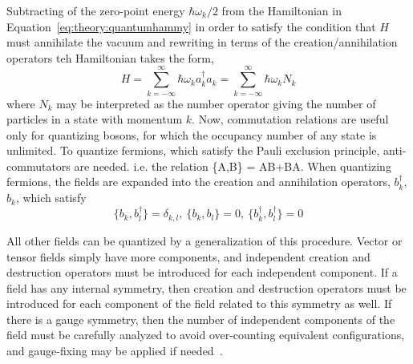 Subtracting of the zero-point energy $\hbar\omega_{k}/2$ from the Hamiltonian in Equation~\ref{eq:theory:quantumhammy} in order to satisfy the condition that $H$ must annihilate the vacuum and rewriting in terms of the creation/annihilation operators teh Hamiltonian takes the form,
\begin{equation}
     H = \sum_{k=-\infty}^{\infty} \hbar\omega_k a_k^\dagger a_k = \sum_{k=-\infty}^{\infty} \hbar\omega_k N_k
\end{equation}
where $N_k$ may be interpreted as the number operator giving the number of particles in a state with momentum $k$.
Now, commutation relations are useful only for quantizing bosons, for which the occupancy number of any state is unlimited. To quantize fermions, which satisfy the Pauli exclusion principle, anti-commutators are needed. i.e. the relation  \{A,B\} = AB+BA.
When quantizing fermions, the fields are expanded into the creation and annihilation operators, $b_{k}^{\dagger}$, $b_{k}$, which satisfy
\begin{equation}
    \{ b_{k}, b_{l}^{\dagger}\} = \delta_{k,l}, ~  \{ b_{k}, b_{l}\} = 0, ~ \{ b_{k}^{\dagger}, b_{l}^{\dagger}\} = 0
\end{equation}

All other fields can be quantized by a generalization of this procedure. Vector or tensor fields simply have more components, and independent creation and destruction operators must be introduced for each independent component. If a field has any internal symmetry, then creation and destruction operators must be introduced for each component of the field related to this symmetry as well. If there is a gauge symmetry, then the number of independent components of the field must be carefully analyzed to avoid over-counting equivalent configurations, and gauge-fixing may be applied if needed~\cite{2013.Klauber}.



